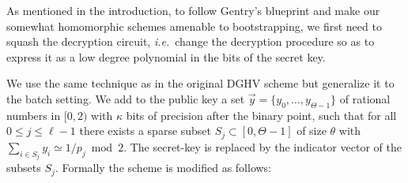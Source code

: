 \documentclass[11pt]{llncs}
\newcommand{\ie}{\textsl{i.e.}\xspace}
\renewcommand\leq\leqslant
\begin{document}
As mentioned in the introduction, to follow Gentry's blueprint and make
our somewhat homomorphic schemes amenable to bootstrapping, we first need
to squash the decryption circuit, \ie~change the decryption procedure
so as to express it as a low degree polynomial in the bits of the secret
key.

We use the same technique as in the original DGHV scheme
\cite{vDGHV2010} but generalize it to 
the batch setting. We add to the public key a set  $\vec y=\{ y_0,
\ldots, y_{\Theta-1} \}$ of rational numbers in $[0, 2)$ with $\kappa$
  bits of precision after the binary point, such that for all  $0 \leq
  j \leq \ell-1$ there exists a sparse subset $S_j \subset
  [0,\Theta-1]$ of size $\theta$ with $\sum_{i\in S_j}y_i\simeq
  1/p_j\bmod 2$.
The secret-key is replaced by the indicator vector of the subsets
$S_j$. Formally the scheme is modified as follows:
\end{document}
